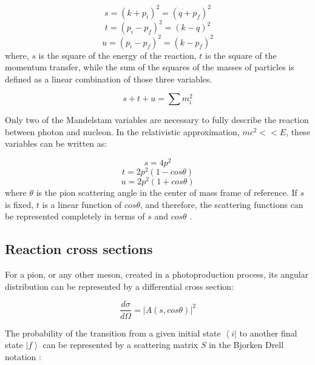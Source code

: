\begin{equation}
s=(k+p_{i})^{2}=(q+p_{f})^{2}
\end{equation}
\begin{equation}
t=(p_{i}-p_{f})^{2}=(k-q)^{2}
\end{equation}
\begin{equation}
u=(p_{i}-p_{f})^{2}=(k-p_{f})^{2}
\end{equation}
where, $s$ is the square of the energy of the reaction, $t$ is the square of the momentum transfer, while the sum of the squares of the masses of particles is defined as a linear combination of those three variables.

\begin{equation}
s+t+u=\sum m^{2}_{i}
\end{equation}

\indent Only two of the Mandelstam variables are necessary to fully describe the reaction between photon and nucleon. In the relativistic approximation, $mc^{2}<<E$, these variables can be written as:

\begin{equation}
s=4p^{2}
\end{equation}
\begin{equation}
t=2p^{2}(1-cos\theta)
\end{equation}
\begin{equation}
u=2p^{2}(1+cos\theta)
\end{equation}
where $\theta$ is the pion scattering angle in the center of mass frame of reference. If $s$ is fixed, $t$ is a linear function of $cos\theta$, and therefore, the scattering functions can be represented completely in terms of $s$ and $cos\theta$ \cite{bertulani}.

\subsection{Reaction cross sections}

\indent For a pion, or any other meson, created in a photoproduction process, its angular distribution can be represented by a differential cross section:

\begin{equation}
\frac{d\sigma}{d\Omega}=|A(s,cos\theta)|^{2}
\end{equation}

\indent The probability of the transition from a given initial state $\left<i\right|$ to another final state $\left|f\right>$ can be represented by a scattering matrix $S$ in the Bjorken Drell notation \cite{bjorken}:

